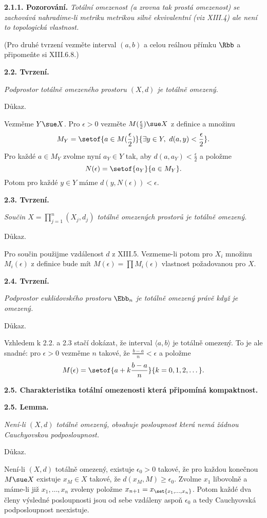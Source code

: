 \documentclass[12pt]{article}
\begin{document}
 \medskip
 
 {\bf 2.1.1. Pozorování.} {\em Totální omezenost (a zrovna tak prostá omezenost) se zachovává nahradime-li metriku metrikou silně ekvivalentní (viz XIII.4) ale není to topologická vlastnost.}
 
 (Pro druhé  tvrzení vezměte interval $(a,b)$ a celou reálnou přímku $\Rbb$ a připomeňte si XIII.6.8.)
 
 \bigskip
 
 {\bf 2.2. Tvrzení.} {\em Podprostor totálně omezeného prostoru $(X,d)$ je totálně omezený.
 
 Důkaz.} Vezměme $Y\sue X$. Pro $\epsilon>0$ vezměte $M(\frac{\epsilon}{2})\sue X$ z definice a množinu
 $$
 M_Y=\setof{a\in M(\frac{\epsilon}2)}{\exists y\in Y, \ d(a,y)<\frac{\epsilon}2}.
 $$
Pro každé $a\in M_Y$ zvolme nyní $a_Y\in Y$ tak, aby $d(a,a_Y)<\frac{\epsilon}2$ a položme
 $$
 N(\epsilon)=\setof{a_Y}{a\in M_Y}.
 $$
 Potom pro každé $y\in Y$ máme $d(y,N(\epsilon))<\epsilon$.\sq
 
 \bigskip
 
 {\bf 2.3. Tvrzení.} {\em Součin $X=\prod_{j=1}^n(X_j,d_j)$ totálně omezených prostorů je totálně omezený.
 
 Důkaz.} Pro součin použijme vzdálenost $d$ z XIII.5. Vezmeme-li potom pro $X_i$ množinu $M_i(\epsilon)$ z definice bude mít $M(\epsilon)=\prod M_i(\epsilon)$ vlastnost požadovanou pro
$X$.\sq

\bigskip

{\bf 2.4. Tvrzení.} {\em Podprostor euklidovského prostoru $\Ebb_n$ je totálně omezený právě když je omezený.

Důkaz.} Vzhledem k 2.2. a 2.3 stačí dokázat, že interval $\langle a,b\rangle$ je totálně omezený. To je ale snadné: pro $\epsilon>0$ vezměme $n$ takové, že $\frac{b-a}{n}<\epsilon$ a položme
$$
M(\epsilon)=\setof{a+k\frac{b-a}{n}}{k=0,1,2,\dots}.
$$\sq

\bigskip

{\bf 2.5. Charakteristika totální omezenosti která připomíná kompaktnost.}
 
\medskip

 {\bf 2.5. Lemma.} {\em Není-li $(X,d)$ totálně omezený, obsahuje posloupnost která nemá žádnou Cauchyovskou podposloupnost.

Důkaz.} Není-li $(X,d)$ totálně omezený, existuje $\epsilon_0>0$ takové, že pro každou konečnou $M\sue X$ existuje $x_M\in X$ takové, že $d(x_M,M)\geq \epsilon_0$. Zvolme $x_1$ libovolně a máme-li již $x_1,\dots,x_n$ zvoleny
položme $x_{n+1}=x_{\set{x_1,\dots,x_n}}$. Potom každé dva členy výsledné posloupnosti jsou od sebe vzdáleny aspoň $\epsilon_0$ a tedy Cauchyovská podposloupnost neexistuje.\sq
\end{document}
